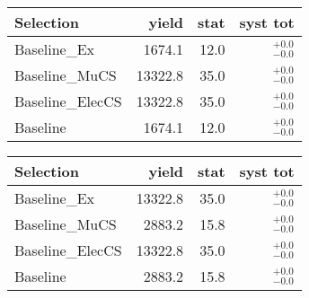 
\begin{tabular}{l|rrr}
\toprule
          Selection & yield & stat & syst tot   \\ 
\midrule
       Baseline\_Ex & 1674.1 & 12.0 & ${}^{+0.0}_{-0.0}$ \\
     Baseline\_MuCS & 13322.8 & 35.0 & ${}^{+0.0}_{-0.0}$ \\
   Baseline\_ElecCS & 13322.8 & 35.0 & ${}^{+0.0}_{-0.0}$ \\
           Baseline & 1674.1 & 12.0 & ${}^{+0.0}_{-0.0}$ \\
\bottomrule
\end{tabular}



\begin{tabular}{l|rrr}
\toprule
          Selection & yield & stat & syst tot   \\ 
\midrule
       Baseline\_Ex & 13322.8 & 35.0 & ${}^{+0.0}_{-0.0}$ \\
     Baseline\_MuCS & 2883.2 & 15.8 & ${}^{+0.0}_{-0.0}$ \\
   Baseline\_ElecCS & 13322.8 & 35.0 & ${}^{+0.0}_{-0.0}$ \\
           Baseline & 2883.2 & 15.8 & ${}^{+0.0}_{-0.0}$ \\
\bottomrule
\end{tabular}
